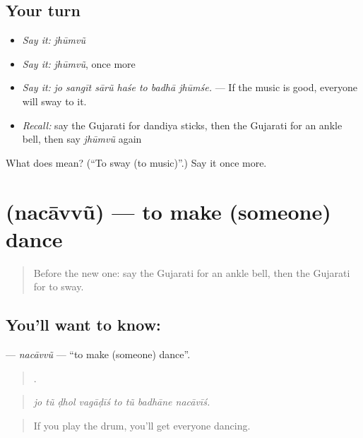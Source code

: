 \subsection*{Your turn}
\begin{itemize}
\raggedright
  \item \emph{Say it:} \emph{jhūmvũ}
  \item \emph{Say it:} \emph{jhūmvũ}, once more
  \item \emph{Say it:} \emph{jo sangīt sārũ haśe to badhā jhūmśe.} — If the music is good, everyone will sway to it.
  \item \emph{Recall:} say the Gujarati for dandiya sticks, then the Gujarati for an ankle bell, then say \emph{jhūmvũ} again
\end{itemize}

\begin{tcolorbox}[breakable,colback=teal!4,colframe=teal!35!black,title={Before you move on}]
What does  mean? (\textquotedblleft{}To sway (to music)\textquotedblright{}.) Say it once more.
\end{tcolorbox}
\section[\texorpdfstring{\gu{નચાવવું} (nacāvvũ)}{નચાવવું (nacāvvũ)}]{ (nacāvvũ) — to make (someone) dance}

\label{lesson:GU-C554-nacavvu}



\begin{quote}
Before the new one: say the Gujarati for an ankle bell, then the Gujarati for to sway.
\end{quote}

\subsection*{You'll want to know: }
\textbf{} — \emph{nacāvvũ} — \textquotedblleft{}to make (someone) dance\textquotedblright{}.

\begin{quote}
       .
\end{quote}

\begin{quote}
\emph{jo tũ ḍhol vagāḍīś to tũ badhāne nacāvīś.}
\end{quote}

\begin{quote}
If you play the drum, you'll get everyone dancing.
\end{quote}

